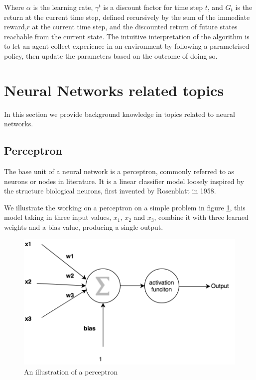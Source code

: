 Where $\alpha$ is the learning rate, $\gamma^{t}$ is a discount factor for time step $t$, and $G_t$ is the return at the current time step, defined recursively by the sum of the immediate reward,$r$ at the current time step, and the discounted return of future states reachable from the current state.  The intuitive interpretation of the algorithm is to let an agent collect experience in an environment by following a parametrised policy, then update the parameters based on the outcome of doing so. 



\section{Neural Networks related topics}

In this section we provide background knowledge in topics related to neural networks. 

\subsection{Perceptron}

The base unit of a neural network is a perceptron, commonly referred to as neurons or nodes in literature. It is a linear classifier model loosely inspired by the structure biological neurons, first invented by Rosenblatt in 1958. \cite{rosenblatt1958perceptron}

We illustrate the working on a perceptron on a simple problem in figure \ref{fig:perceptron}, this model taking in three input values, $x_1$, $x_2$ and $x_3$, combine it with three learned weights and a bias value, producing a single output.

\begin{figure}[H]
	\centering
	\includegraphics[width=0.7\linewidth]{images/chapter_2/Perceptron}
	\caption{An illustration of a perceptron}
	\label{fig:perceptron}
\end{figure}


